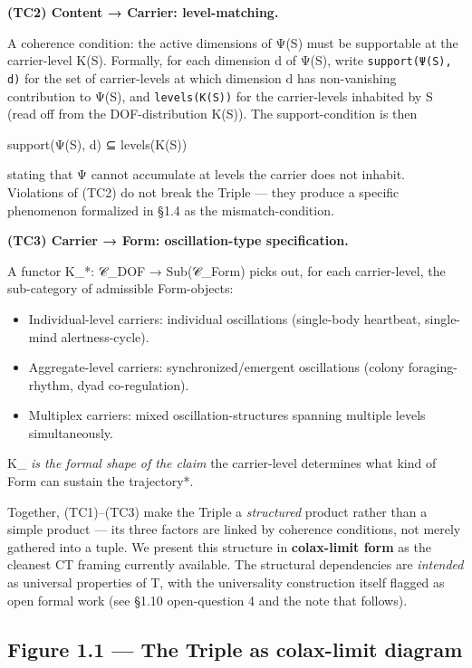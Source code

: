 \documentclass[11pt, openany]{book}
\begin{document}
\textbf{(TC2) Content → Carrier: level-matching.}

A coherence condition: the active dimensions of Ψ(S) must be supportable at the carrier-level Κ(S). Formally, for each dimension d of Ψ(S), write \texttt{support(Ψ(S), d)} for the set of carrier-levels at which dimension d has non-vanishing contribution to Ψ(S), and \texttt{levels(Κ(S))} for the carrier-levels inhabited by S (read off from the DOF-distribution Κ(S)). The support-condition is then

\begin{Code}
support(Ψ(S), d) ⊆ levels(Κ(S))
\end{Code}

stating that Ψ cannot accumulate at levels the carrier does not inhabit. Violations of (TC2) do not break the Triple --- they produce a specific phenomenon formalized in §1.4 as the mismatch-condition.

\textbf{(TC3) Carrier → Form: oscillation-type specification.}

A functor Κ\_\allowbreak{}*: 𝒞\_\allowbreak{}DOF → Sub(𝒞\_\allowbreak{}Form) picks out, for each carrier-level, the sub-category of admissible Form-objects:

\begin{itemize}
\item Individual-level carriers: individual oscillations (single-body heartbeat, single-mind alertness-cycle).
\item Aggregate-level carriers: synchronized/emergent oscillations (colony foraging-rhythm, dyad co-regulation).
\item Multiplex carriers: mixed oscillation-structures spanning multiple levels simultaneously.
\end{itemize}

Κ\_\allowbreak{}\textit{ is the formal shape of the claim }the carrier-level determines what kind of Form can sustain the trajectory*.

Together, (TC1)–(TC3) make the Triple a \textit{structured} product rather than a simple product --- its three factors are linked by coherence conditions, not merely gathered into a tuple. We present this structure in \textbf{colax-limit form} as the cleanest CT framing currently available. The structural dependencies are \textit{intended} as universal properties of T, with the universality construction itself flagged as open formal work (see §1.10 open-question 4 and the note that follows).

\subsection{Figure 1.1 --- The Triple as colax-limit diagram}
\end{document}
